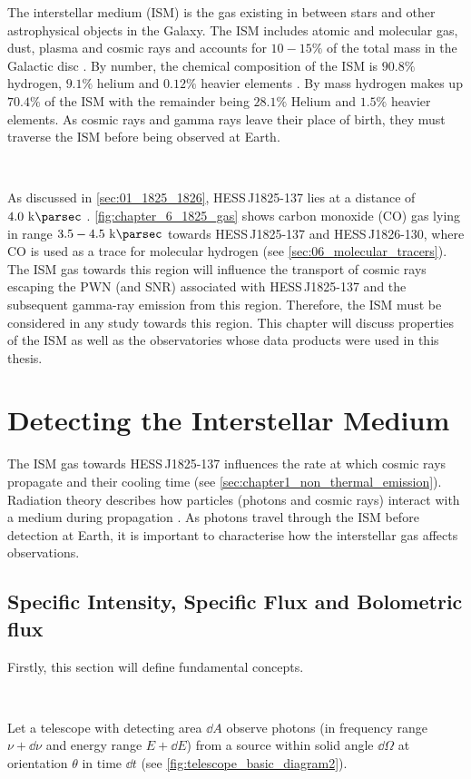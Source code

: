The interstellar medium (ISM) is the gas existing in between stars and other astrophysical objects in the Galaxy. The ISM includes atomic and molecular gas, dust, plasma and cosmic rays and accounts for $10-15\%$ of the total mass in the Galactic disc \citep{2001RvMP...73.1031F}. By number, the chemical composition of the ISM is $90.8\%$ hydrogen, $9.1\%$ helium and $0.12\%$ heavier elements \citep{2001RvMP...73.1031F}. By mass hydrogen makes up $70.4\%$ of the ISM with the remainder being $28.1\%$ Helium and $1.5\%$ heavier elements. As cosmic rays and gamma rays leave their place of birth, they must traverse the ISM before being observed at Earth.
\par~\par 
As discussed in \autoref{sec:01_1825_1826}, \mbox{HESS\,J1825-137} lies at a distance of $4.0~\kpc$  \citep{2006A&A...460..365A}. \autoref{fig:chapter_6_1825_gas} shows carbon monoxide (CO) gas lying in range $3.5-4.5~\kpc$ towards \mbox{HESS\,J1825-137} and \mbox{HESS\,J1826-130}, where CO is used as a trace for molecular hydrogen (see \autoref{sec:06_molecular_tracers}). The ISM gas towards this region will influence the transport of cosmic rays escaping the PWN (and SNR) associated with \mbox{HESS\,J1825-137} and the subsequent gamma-ray emission from this region. Therefore, the ISM must be considered in any study towards this region. This chapter will discuss properties of the ISM as well as the observatories whose data products were used in this thesis.
\newpage  %
\section{Detecting the Interstellar Medium}

The ISM gas towards \mbox{HESS\,J1825-137} influences the rate at which cosmic rays propagate and their cooling time (see \autoref{sec:chapter1_non_thermal_emission}). Radiation theory describes how particles (photons and cosmic rays) interact with a medium during propagation \citep{2011piim.book.....D}. As photons travel through the ISM before detection at Earth, it is important to characterise how the interstellar gas affects observations.

\subsection{Specific Intensity, Specific Flux and Bolometric flux}

Firstly, this section will define fundamental concepts.
\par~\par 
\noindent Let a telescope with detecting area $\dd{A}$ observe photons (in frequency range $\nu + \dd{\nu}$ and energy range $E+\dd{E}$) from a source within solid angle $\dd{\Omega}$ at orientation $\theta$ in time $\dd{t}$ (see \autoref{fig:telescope_basic_diagram2}).

